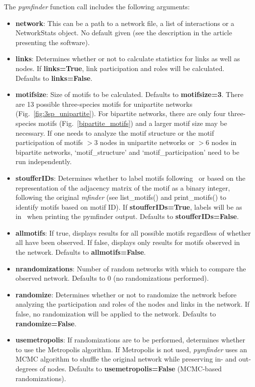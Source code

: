 \documentclass[12pt]{article}
\begin{document}
			The \emph{pymfinder} function call includes the following arguments:
     	\begin{itemize}
     		\item \textbf{network}: This can be a path to a network file, a list of interactions or a NetworkStats object. No default given (see the description in the article presenting the software).
				\item \textbf{links}: Determines whether or not to calculate statistics for links as well as nodes. If \textbf{links=True}, link participation and roles will be calculated. Defaults to \textbf{links=False}.
				\item \textbf{motifsize}: Size of motifs to be calculated. Defaults to \textbf{motifsize=3}. There are 13 possible three-species motifs for unipartite networks (Fig.~\ref{fig:3sp_unipartite}). For bipartite networks, there are only four three-species motifs (Fig.~\ref{bipartite_motifs}) and a larger motif size may be necessary. If one needs to analyze the motif structure or the motif participation of motifs $>3$ nodes in unipartite networks or $>6$ nodes in bipartite networks, `motif\_structure' and `motif\_participation' need to be run independently.
				\item \textbf{stoufferIDs}: Determines whether to label motifs following~\citet{Stouffer2007} or based on the representation of the adjacency matrix of the motif as a binary integer, following the original \emph{mfinder} (see list\_motifs() and print\_motifs() to identify motifs based on motif ID). If \textbf{stoufferIDs=True}, labels will be as in~\citet{Stouffer2007} when printing the pymfinder output. Defaults to \textbf{stoufferIDs=False}.
				\item \textbf{allmotifs}: If true, displays results for all possible motifs regardless of whether all have been observed. If false, displays only results for motifs observed in the network. Defaults to \textbf{allmotifs=False}.
				\item \textbf{nrandomizations}: Number of random networks with which to compare the observed network. Defaults to 0 (no randomizations performed).
				\item \textbf{randomize}: Determines whether or not to randomize the network before analyzing the participation and roles of the nodes and links in the network. If false, no randomization will be applied to the network. Defaults to \textbf{randomize=False}.
				\item \textbf{usemetropolis}: If randomizations are to be performed, determines whether to use the Metropolis algorithm. If Metropolis is not used, \emph{pymfinder} uses an MCMC algorithm to shuffle the original network while preserving in- and out-degrees of nodes. Defaults to \textbf{usemetropolis=False} (MCMC-based randomizations).

\end{itemize}
\end{document}
